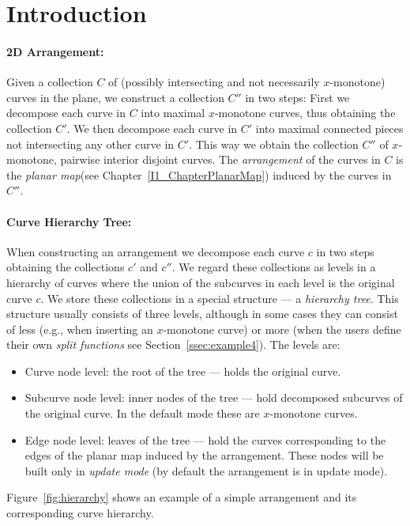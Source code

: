 \section{Introduction}

\paragraph{2D Arrangement:} Given a collection $C$ of (possibly
intersecting and not necessarily $x$-monotone) curves in the plane,
we construct a collection 
$C''$ in two steps: First we decompose each curve in $C$ into maximal
$x$-monotone curves, thus obtaining the collection $C'$. We then
decompose each curve in $C'$ into maximal connected pieces not
intersecting any other curve in $C'$. This way we obtain the
collection $C''$ of $x$-monotone, pairwise interior disjoint curves.
The {\em arrangement} of the curves in $C$ is the
{\it planar map}(see Chapter~\ref{I1_ChapterPlanarMap})
induced by the curves in $C''$.
 
\paragraph{Curve Hierarchy Tree:} When constructing an arrangement
we decompose each curve $c$ in two steps obtaining the collections $c'$
and $c''$. We regard these collections as levels in a hierarchy of 
curves where the union of the subcurves in each level is the original curve
$c$. We store these collections in a special structure --- a {\em hierarchy
tree}. This structure usually consists of three levels, although
in some cases they can consist of less (e.g., when inserting an $x$-monotone 
curve) or more (when the users define their own {\em split functions} see
Section~\ref{ssec:example4}). The levels are:
\begin{itemize}
\item Curve node level: the root of the tree --- holds the original curve.
\item Subcurve node level: inner nodes of the tree --- hold decomposed
subcurves of
the original curve. In the default mode these are $x$-monotone curves.
\item Edge node level: leaves of the tree --- hold the curves corresponding to
the edges of the planar map induced by the arrangement. These nodes will
be built only in {\em update mode} (by default the arrangement is in
update mode).
\end{itemize}

Figure~\ref{fig:hierarchy} shows an example of a simple arrangement and its 
corresponding curve hierarchy.

